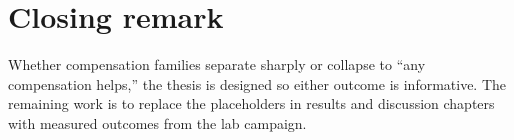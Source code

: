 \section{Closing remark}
\label{sec:conclusion-close}

Whether compensation families separate sharply or collapse to ``any compensation helps,'' the thesis
is designed so either outcome is informative. The remaining work is to replace the placeholders in
results and discussion chapters with measured outcomes from the lab campaign.
